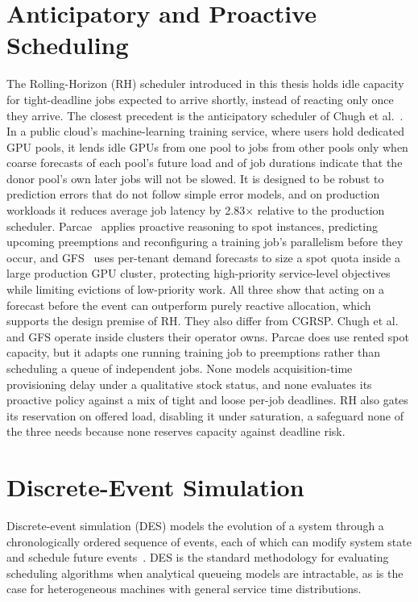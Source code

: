 \section{Anticipatory and Proactive Scheduling}
\label{sec:anticipatory-and-proactive-scheduling}

The Rolling-Horizon (RH) scheduler introduced in this thesis holds idle capacity for tight-deadline jobs expected to arrive shortly, instead of reacting only once they arrive. The closest precedent is the anticipatory scheduler of Chugh et al.~\cite{chugh2023anticipatory}. In a public cloud's machine-learning training service, where users hold dedicated GPU pools, it lends idle GPUs from one pool to jobs from other pools only when coarse forecasts of each pool's future load and of job durations indicate that the donor pool's own later jobs will not be slowed. It is designed to be robust to prediction errors that do not follow simple error models, and on production workloads it reduces average job latency by 2.83$\times$ relative to the production scheduler. Parcae~\cite{duan2024parcae} applies proactive reasoning to spot instances, predicting upcoming preemptions and reconfiguring a training job's parallelism before they occur, and GFS~\cite{duan2026gfs} uses per-tenant demand forecasts to size a spot quota inside a large production GPU cluster, protecting high-priority service-level objectives while limiting evictions of low-priority work. All three show that acting on a forecast before the event can outperform purely reactive allocation, which supports the design premise of RH. They also differ from CGRSP. Chugh et al. and GFS operate inside clusters their operator owns. Parcae does use rented spot capacity, but it adapts one running training job to preemptions rather than scheduling a queue of independent jobs. None models acquisition-time provisioning delay under a qualitative stock status, and none evaluates its proactive policy against a mix of tight and loose per-job deadlines. RH also gates its reservation on offered load, disabling it under saturation, a safeguard none of the three needs because none reserves capacity against deadline risk.

\section{Discrete-Event Simulation}
\label{sec:discrete-event-simulation}

Discrete-event simulation (DES) models the evolution of a system through a chronologically ordered sequence of events, each of which can modify system state and schedule future events~\cite{banks2010discrete}. DES is the standard methodology for evaluating scheduling algorithms when analytical queueing models are intractable, as is the case for heterogeneous machines with general service time distributions.

